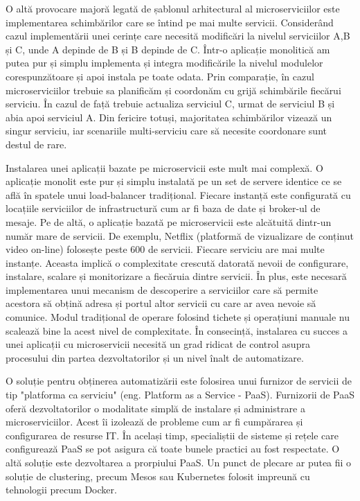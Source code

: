 \documentclass[12pt, a4paper, oneside, romanian]{teza-upb}
\begin{document}
O altă provocare majoră legată de șablonul arhitectural al microserviciilor este implementarea schimbărilor care se întind pe mai multe servicii. Considerând cazul implementării unei cerințe care necesită modificări la nivelul serviciilor A,B și C, unde A depinde de B și B depinde de C. Într-o aplicație monolitică am putea pur și simplu implementa și integra modificările la nivelul modulelor corespunzătoare și apoi instala pe toate odata. Prin comparație, în cazul microserviciilor trebuie sa planificăm și coordonăm cu grijă schimbările fiecărui serviciu. În cazul de față trebuie actualiza serviciul C, urmat de serviciul B și abia apoi serviciul A. Din fericire totuși, majoritatea schimbărilor vizează un singur serviciu, iar scenariile multi-serviciu care să necesite coordonare sunt destul de rare.

Instalarea unei aplicații bazate pe microservicii este mult mai complexă. O aplicație monolit este pur și simplu instalată pe un set de servere identice ce se află în spatele unui load-balancer tradițional. Fiecare instanță este configurată cu locațiile serviciilor de infrastructură cum ar fi baza de date și broker-ul de mesaje. Pe de altă, o aplicație bazată pe microservicii este alcătuită dintr-un număr mare de servicii. De exemplu, Netflix (platformă de vizualizare de conținut video on-line) folosește peste 600 de servicii. Fiecare serviciu are mai multe instanțe. Aceasta implică o complexitate crescută datorată nevoii de configurare, instalare, scalare și monitorizare a fiecăruia dintre servicii. În plus, este necesară implementarea unui mecanism de descoperire a serviciilor care să permite acestora să obțină adresa și portul altor servicii cu care ar avea nevoie să comunice. Modul tradițional de operare folosind tichete și operațiuni manuale nu scalează bine la acest nivel de complexitate. În consecință, instalarea cu succes a unei aplicații cu microservicii necesită un grad ridicat de control asupra procesului din partea dezvoltatorilor și un nivel înalt de automatizare. 

O soluție pentru obținerea automatizării este folosirea unui furnizor de servicii de tip "platforma ca serviciu" (eng. Platform as a Service - PaaS). Furnizorii de PaaS oferă dezvoltatorilor o modalitate simplă de instalare și administrare a microserviciilor. Acest îi izolează de probleme cum ar fi cumpărarea și configurarea de resurse IT. În același timp, specialiștii de sisteme și rețele care configurează PaaS se pot asigura că toate bunele practici au fost respectate. O altă soluție este dezvoltarea a prorpiului PaaS. Un punct de plecare ar putea fii o soluție de clustering, precum Mesos sau Kubernetes folosit impreună cu tehnologii precum Docker. 
\end{document}
